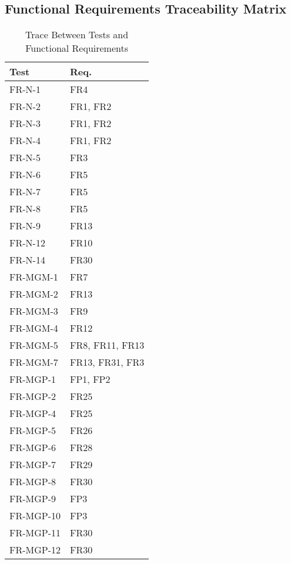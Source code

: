 \documentclass[12pt, titlepage]{article}
\begin{document}
\subsection{Functional Requirements Traceability Matrix}
\begin{table}[H]
\centering
\begin{tabular}{p{} p{}}
\toprule
\textbf{Test} & \textbf{Req.}\\
\midrule
FR-N-1 & FR4\\
FR-N-2 & FR1, FR2\\
FR-N-3 & FR1, FR2\\
FR-N-4 & FR1, FR2\\
FR-N-5 & FR3\\
FR-N-6 & FR5\\
FR-N-7 & FR5\\
FR-N-8 & FR5\\
FR-N-9 & FR13\\
FR-N-12 & FR10\\
FR-N-14 & FR30\\
FR-MGM-1 & FR7\\
FR-MGM-2 & FR13\\
FR-MGM-3 & FR9\\
FR-MGM-4 & FR12\\
FR-MGM-5 & FR8, FR11, FR13\\
FR-MGM-7 & FR13, FR31, FR3\\
FR-MGP-1 & FP1, FP2\\
FR-MGP-2 & FR25\\
FR-MGP-4 & FR25\\
FR-MGP-5 & FR26\\
FR-MGP-6 & FR28\\
FR-MGP-7 & FR29\\
FR-MGP-8 & FR30\\
FR-MGP-9 & FP3\\
FR-MGP-10 & FP3\\
FR-MGP-11 & FR30\\
FR-MGP-12 & FR30\\
\bottomrule
\end{tabular}
\caption{Trace Between Tests and Functional Requirements}
\label{TblTFR}
\end{table}

\newpage
\end{document}
